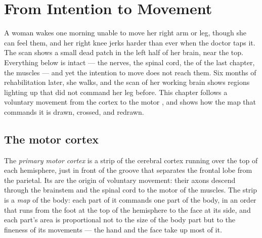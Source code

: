 \chapter{From Intention to Movement}\label{ch:g12:brain-and-movement}

A woman wakes one morning unable to move her right arm or leg, though
she can feel them, and her right knee jerks harder than ever when the
doctor taps it. The scan shows a small dead patch in the left half of
her brain, near the top. Everything below is intact --- the nerves,
the spinal cord, the  of the last chapter, the muscles ---
and yet the intention to move does not reach them. Six months of
rehabilitation later, she walks, and the scan of her working brain
shows regions lighting up that did not command her leg before. This
chapter follows a voluntary movement from the cortex to the motor
, and shows how the map that commands it is drawn, crossed, and
redrawn.

\section{The motor cortex}

\begin{definition}\label{def:g12:brain-and-movement:cortex}
The \emph{primary motor cortex} is a strip of the
cerebral cortex running over the top of each hemisphere, just in front
of the groove that separates the frontal lobe from the parietal. Its
 are the origin of voluntary movement: their axons descend
through the brainstem and the spinal cord to the motor  of the
muscles. The strip is a \emph{map} of the body: each part of it
commands one part of the body, in an order that runs from the foot at
the top of the hemisphere to the face at its side, and each part's
area is proportional not to the size of the body part but to the
fineness of its movements --- the hand and the face take up most of it.
\end{definition}

